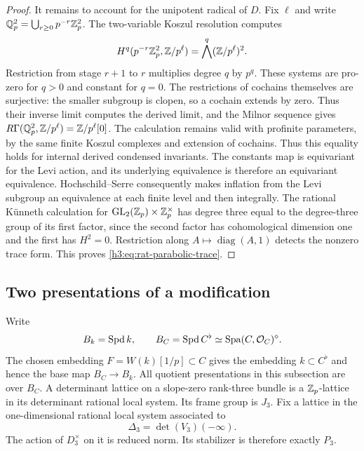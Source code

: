 \begin{proof}
It remains to account for the unipotent radical of $D$.
Fix $\ell$ and write $\mathbb Q_p^2=\bigcup_{r\geq0}p^{-r}\mathbb Z_p^2$.
The two-variable Koszul resolution computes
\[
 H^q(p^{-r}\mathbb Z_p^2,\mathbb Z/p^\ell)
       =\bigwedge^q(\mathbb Z/p^\ell)^2.
\]
Restriction from stage $r+1$ to $r$ multiplies degree $q$ by
$p^q$.  These systems are pro-zero for $q>0$ and constant for
$q=0$.  The restrictions of cochains themselves are surjective:
the smaller subgroup is clopen, so a cochain extends by zero.
Thus their inverse limit computes the derived limit, and the
Milnor sequence gives
$R\Gamma(\mathbb Q_p^2,\mathbb Z/p^\ell)=\mathbb Z/p^\ell[0]$.
The calculation remains valid with profinite parameters, by the
same finite Koszul complexes and extension of cochains.
Thus this equality holds for internal derived condensed invariants.
The constants map is equivariant for the Levi action, and its
underlying equivalence is therefore an equivariant equivalence.
Hochschild--Serre consequently makes inflation from the Levi subgroup
an equivalence at each finite level and then integrally.
The rational K\"unneth calculation for
$\operatorname{GL}_2(\mathbb Z_p)\times\mathbb Z_p^\times$ has degree three equal to the
degree-three group of its first factor, since the second factor
has cohomological dimension one and the first has $H^2=0$.
Restriction along $A\mapsto\operatorname{diag}(A,1)$ detects the
nonzero trace form.  This proves \eqref{h3:eq:rat-parabolic-trace}.
\end{proof}

\subsection{Two presentations of a modification}

Write
\[
 B_k=\operatorname{Spd} k,\qquad
 B_C=\operatorname{Spd} C^\flat\simeq\operatorname{Spa}(C,\mathcal O_C)^\diamond.
\]
The chosen embedding $F=W(k)[1/p]\subset C$ gives the embedding
$k\subset C^\flat$ and hence the base map $B_C\to B_k$.
All quotient presentations in this subsection are over $B_C$.
A determinant lattice on a slope-zero rank-three bundle is a
$\mathbb Z_p$-lattice in its determinant rational local system.  Its frame
group is $J_3$.  Fix a lattice in the one-dimensional rational
local system associated to
\[
 \Delta_3=\det(V_3)(-\infty).
\]
The action of $D_3^\times$ on it is reduced norm.  Its stabilizer
is therefore exactly $P_3$.

